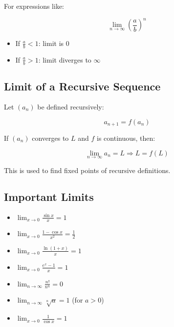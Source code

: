 For expressions like:

\[
    \lim_{n \to \infty} {\left( \frac{a}{b} \right)}^n
\]

\begin{itemize}

    \item If \(\frac{a}{b} < 1\): limit is \(0\)

    \item If \(\frac{a}{b} > 1\): limit diverges to \(\infty\)

\end{itemize}

\subsection{Limit of a Recursive Sequence}

Let \((a_n)\) be defined recursively:

\[
    a_{n+1} = f(a_n)
\]

If \((a_n)\) converges to \(L\) and \(f\) is continuous, then:

\[
    \lim_{n \to \infty} a_n = L \Rightarrow L = f(L)
\]

This is used to find fixed points of recursive definitions.

\subsection{Important Limits}

\begin{itemize}

    \item \(\displaystyle \lim_{x \to 0} \frac{\sin x}{x} = 1\)

    \item \(\displaystyle \lim_{x \to 0} \frac{1 - \cos x}{x^2} = \frac{1}{2}\)

    \item \(\displaystyle \lim_{x \to 0} \frac{\ln(1 + x)}{x} = 1\)

    \item \(\displaystyle \lim_{x \to 0} \frac{e^x - 1}{x} = 1\)

    \item \(\displaystyle \lim_{n \to \infty} \frac{n!}{n^n} = 0\)

    \item \(\displaystyle \lim_{n \to \infty} \sqrt[n]{a} = 1\) (for \(a > 0\))

    \item \(\displaystyle \lim_{x \to 0} \frac{1}{\cos x} = 1\)

\end{itemize}

